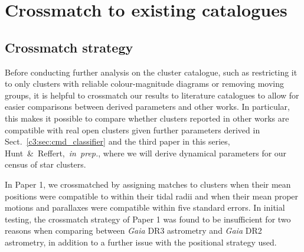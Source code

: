 





\section{Crossmatch to existing catalogues}\label{c3:sec:crossmatching}

\subsection{Crossmatch strategy}

Before conducting further analysis on the cluster catalogue, such as restricting it to only clusters with reliable colour-magnitude diagrams or removing moving groups, it is helpful to crossmatch our results to literature catalogues to allow for easier comparisons between derived parameters and other works. In particular, this makes it possible to compare whether clusters reported in other works are compatible with real open clusters given further parameters derived in Sect.~\ref{c3:sec:cmd_classifier} and the third paper in this series, Hunt~\&~Reffert,~\emph{in~prep.}, where we will derive dynamical parameters for our census of star clusters.

In Paper 1, we crossmatched by assigning matches to clusters when their mean positions were compatible to within their tidal radii and when their mean proper motions and parallaxes were compatible within five standard errors. In initial testing, the crossmatch strategy of Paper 1 was found to be insufficient for two reasons when comparing between \emph{Gaia} DR3 astrometry and \emph{Gaia} DR2 astrometry, in addition to a further issue with the positional strategy used.

